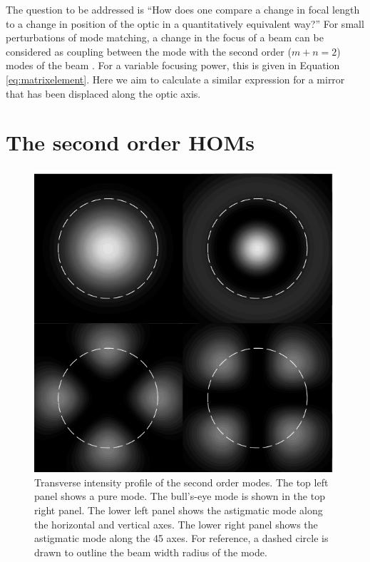 The question to be addressed is ``How does one compare a change in focal length to a change in position of the optic in a quantitatively equivalent way?'' %
For small perturbations of mode matching, a change in the focus of a beam can be considered as coupling between the  mode with the second order ($m+n=2$) modes of the beam \cite{Anderson1984}. %
For a variable focusing power, this is given in Equation \ref{eq:matrixelement}. %
Here we aim to calculate a similar expression for a mirror  that has been displaced along the optic axis.

\section{The second order HOMs}
\label{sec:secondordermodes}

\begin{figure}[h!]
  \begin{center}
  \leavevmode
  \includegraphics{figs-ap-notes/puresecondordermodes.pdf}
  \end{center}
  \caption[Transverse intensity profile of the second order modes.]{Transverse intensity profile of the second order modes. The top left panel shows a pure  mode. The bull's-eye mode is shown in the top right panel. The lower left panel shows the astigmatic mode along the horizontal and vertical axes. The lower right panel shows the astigmatic mode along the 45\degrees{} axes. For reference, a dashed circle is drawn to outline the beam width radius of the  mode.}
  \label{fig:puresecondordermodes}
\end{figure}

